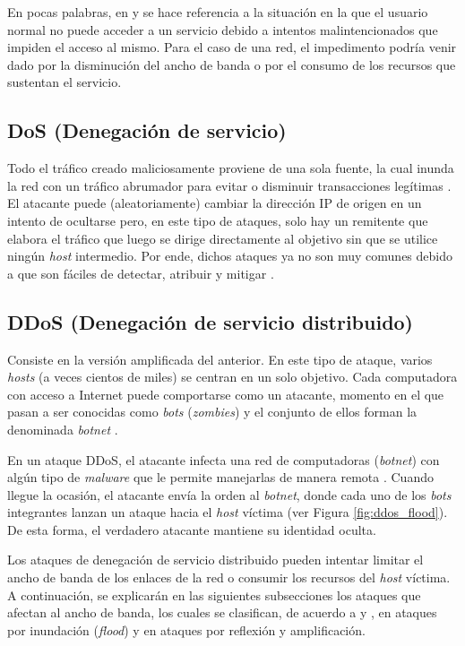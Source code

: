 En pocas palabras, en \parencite{ddos_amir} y \parencite{ddos_kumar} se hace
referencia a la situación en la que el usuario normal no puede acceder a un
servicio debido a intentos malintencionados que impiden el acceso al mismo. Para
el caso de una red, el impedimento podría venir dado por la disminución del
ancho de banda o por el consumo de los recursos que sustentan el servicio.

\subsection {DoS (Denegación de servicio)}

Todo el tráfico creado maliciosamente proviene de una sola fuente, la cual
inunda la red con un tráfico abrumador para evitar o disminuir transacciones
legítimas \parencite{ddos_mirkovic}. El atacante puede (aleatoriamente) cambiar
la dirección IP de origen en un intento de ocultarse pero, en este tipo de
ataques, solo hay un remitente que elabora el tráfico que luego se dirige
directamente al objetivo sin que se utilice ningún \textit{host} intermedio. Por
ende, dichos ataques ya no son muy comunes debido a que son fáciles de detectar,
atribuir y mitigar \parencite{ddos_hh}.

\subsection {DDoS (Denegación de servicio distribuido)}

Consiste en la versión amplificada del anterior. En este tipo de ataque, varios
\textit{hosts} (a veces cientos de miles) se centran en un solo objetivo. Cada
computadora con acceso a Internet puede comportarse como un atacante, momento en
el que pasan a ser conocidas como \textit{bots} (\textit{zombies}) y el conjunto
de ellos forman la denominada \textit{botnet} \parencite{ddos_amir}.

En un ataque DDoS, el atacante infecta una red de computadoras (\textit{botnet})
con algún tipo de \textit{malware} que le permite manejarlas de manera remota
\parencite{ddos_kumar}. Cuando llegue la ocasión, el atacante envía la orden al
\textit{botnet}, donde cada uno de los \textit{bots} integrantes lanzan un
ataque hacia el \textit{host} víctima (ver Figura \ref{fig:ddos_flood}). De esta
forma, el verdadero atacante mantiene su identidad oculta.

Los ataques de denegación de servicio distribuido pueden intentar limitar el
ancho de banda de los enlaces de la red o consumir los recursos del
\textit{host} víctima. A continuación, se explicarán en las siguientes
subsecciones los ataques que afectan al ancho de banda, los cuales se
clasifican, de acuerdo a \parencite{ddos_amir} y \parencite{ddos_hh}, en ataques
por inundación (\textit{flood}) y en ataques por reflexión y amplificación.
\\

